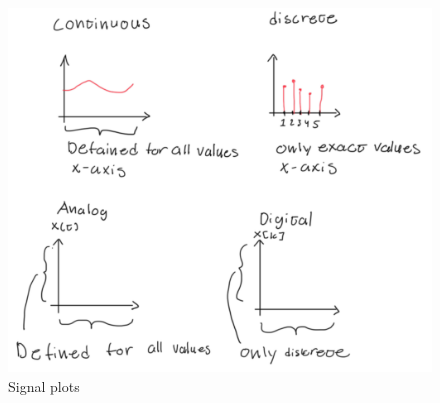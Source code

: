 \begin{figure}[H]
    \centering
    \includegraphics[width=12cm]{image/caractaristic-signal-plots.pdf}
    \caption{Signal plots}
\end{figure}

